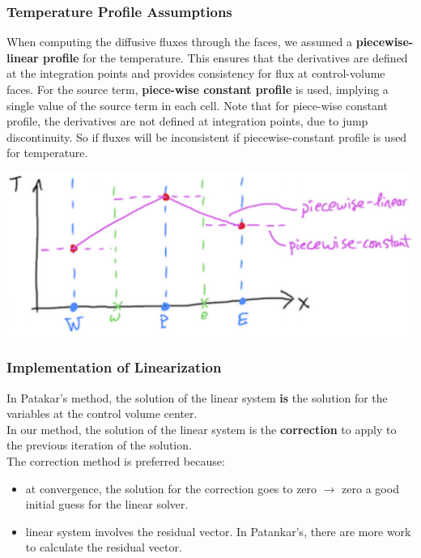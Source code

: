 \documentclass[14pt]{article}
\begin{document}
\subsubsection{Temperature Profile Assumptions}
\label{sec:org1adc0f0}
When computing the diffusive fluxes through the faces, we assumed a \textbf{piecewise-linear profile} for the temperature.
This ensures that the derivatives are defined at the integration points and provides consistency for flux
at control-volume faces. For the source term, \textbf{piece-wise constant profile} is used, implying a single value of the source
term in each cell. Note that for piece-wise constant profile, the derivatives are not defined at integration points, due to
jump discontinuity. So if fluxes will be inconsistent if piecewise-constant profile is used for temperature.
\begin{center}
\includegraphics[scale=0.2]{pic/heat1D_profilePW.png}
\end{center}
\subsubsection{Implementation of Linearization}
\label{sec:org1729c3e}
In Patakar's method, the solution of the linear system \textbf{is} the solution for the variables at the control volume center.\\
In our method, the solution of the linear system is the \textbf{correction} to apply to the previous iteration of the solution. \\
The correction method is preferred because:
\begin{itemize}
\item at convergence, the solution for the correction goes to zero \(\rightarrow\) zero a good initial guess for the linear solver.
\item linear system involves the residual vector. In Patankar's, there are more work to calculate the residual vector.
\end{itemize}
\end{document}
